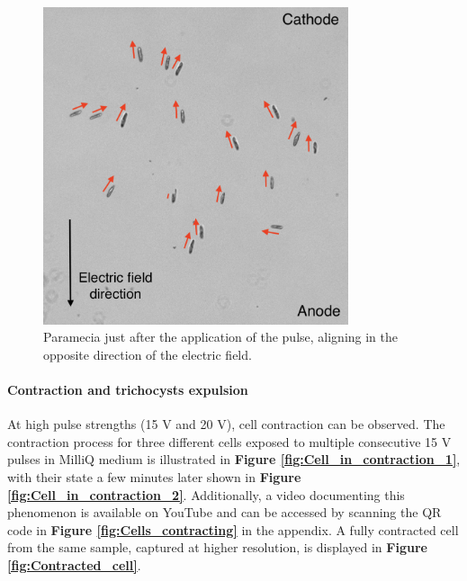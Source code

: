 \begin{minipage}{0.49\textwidth}
\begin{figure}[H]
\centering 
\captionsetup{width=0.9\linewidth, justification=centering}
\includegraphics[width=0.8\textwidth]{Figures/aligning_during_pulse.png}
\caption{Paramecia just after the application of the pulse, aligning in the opposite direction of the electric field.} 
\label{fig:aligning_during_pulse}
\end{figure}
\end{minipage}

\paragraph{Contraction and trichocysts expulsion}
At high pulse strengths (15 V and 20 V), cell contraction can be observed. The contraction process for three different cells exposed to multiple consecutive 15 V pulses in MilliQ medium is illustrated in \textbf{Figure \ref{fig:Cell_in_contraction_1}}, with their state a few minutes later shown in \textbf{Figure \ref{fig:Cell_in_contraction_2}}. Additionally, a video documenting this phenomenon is available on YouTube and can be accessed by scanning the QR code in \textbf{Figure \ref{fig:Cells_contracting}} in the appendix. A fully contracted cell from the same sample, captured at higher resolution, is displayed in \textbf{Figure \ref{fig:Contracted_cell}}.

